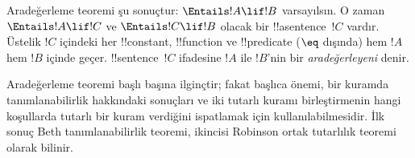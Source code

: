 \documentclass[../../../include/open-logic-section]{subfiles}
\begin{document}


Aradeğerleme teoremi şu sonuçtur: $\Entails !A\lif !B$ varsayılsın.
O zaman $\Entails !A\lif !C$ ve $\Entails !C\lif !B$ olacak bir
!!a{sentence}~$!C$ vardır. Üstelik $!C$ içindeki her !!{constant},
!!{function} ve !!{predicate} ($\eq$ dışında) hem $!A$ hem $!B$ içinde
geçer. !!{sentence}~$!C$ ifadesine $!A$ ile $!B$'nin bir
\emph{aradeğerleyeni} denir.

Aradeğerleme teoremi başlı başına ilginçtir; fakat başlıca önemi, bir
kuramda tanımlanabilirlik hakkındaki sonuçları ve iki tutarlı kuramı
birleştirmenin hangi koşullarda tutarlı bir kuram verdiğini ispatlamak
için kullanılabilmesidir. İlk sonuç Beth tanımlanabilirlik teoremi,
ikincisi Robinson ortak tutarlılık teoremi olarak bilinir.
\end{document}
